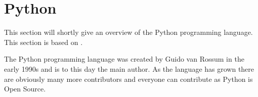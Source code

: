 \section{Python}
This section will shortly give an overview of the Python programming language.
This section is based on \citet{python_docs}.

The Python programming language was created by Guido van Rossum in the early 1990s and is to this day the main author.
As the language has grown there are obviously many more contributors and everyone can contribute as Python is Open Source.

